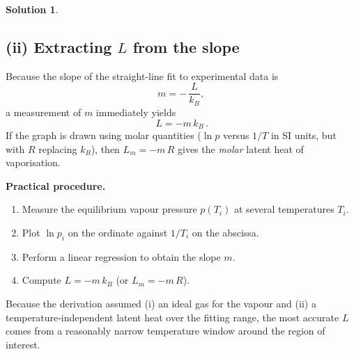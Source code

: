 \documentclass[12pt]{article}
\theoremstyle{definition} %
\newtheorem{solution}{Solution}
\theoremstyle{plain} %
\begin{document}
\begin{solution}
                      \subsection*{(ii) Extracting \(L\) from the slope}
                      Because the slope of the straight‑line fit to experimental data is
                      \[
                        m = -\,\frac{L}{k_B},
                      \]
                      a measurement of \(m\) immediately yields
                      \[
                        \boxed{\,L = -m\,k_B\,}.
                      \]
                      If the graph is drawn using molar quantities (\(\ln p\) versus \(1/T\) in SI
                      units, but with \(R\) replacing \(k_B\)), then
                      \(
                        L_m = -m\,R
                      \)
                      gives the \emph{molar} latent heat of vaporisation.
                      
                      \medskip
                      \textbf{Practical procedure.}
                      \begin{enumerate}
                        \item Measure the equilibrium vapour pressure \(p(T_i)\) at several
                              temperatures \(T_i\).
                        \item Plot \(\ln p_i\) on the ordinate against \(1/T_i\) on the abscissa.
                        \item Perform a linear regression to obtain the slope \(m\).
                        \item Compute \(L = -m\,k_B\) (or \(L_m = -m\,R\)).
                      \end{enumerate}
                      
                      Because the derivation assumed (i) an ideal gas for the vapour and
                      (ii) a temperature‑independent latent heat over the fitting range,
                      the most accurate \(L\) comes from a reasonably narrow temperature window
                      around the region of interest.
                      \end{solution}
\end{document}
